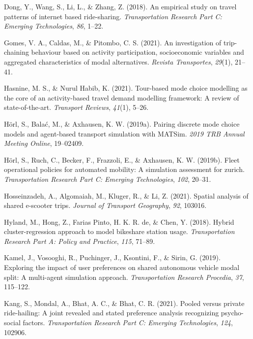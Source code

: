\documentclass[simple, masters, twoside]{byuthesis}
\newlength{\cslhangindent}
\newlength{\cslentryspacingunit} %
\newenvironment{CSLReferences}[2] %
 {%
  \setlength{\parindent}{0pt}
  \ifodd #1
  \let\oldpar\par
  \def\par{\hangindent=\cslhangindent\oldpar}
  \fi
  \setlength{\parskip}{#2\cslentryspacingunit}
 }%
 {}
\begin{document}
\begin{CSLReferences}{1}{0}
\leavevmode{}%
Dong, Y., Wang, S., Li, L., \& Zhang, Z. (2018). An empirical study on travel patterns of internet based ride-sharing. \emph{Transportation Research Part C: Emerging Technologies}, \emph{86}, 1--22.

\leavevmode{}%
Gomes, V. A., Caldas, M., \& Pitombo, C. S. (2021). An investigation of trip-chaining behaviour based on activity participation, socioeconomic variables and aggregated characteristics of modal alternatives. \emph{Revista Transportes}, \emph{29}(1), 21--41.

\leavevmode{}%
Hasnine, M. S., \& Nurul Habib, K. (2021). Tour-based mode choice modelling as the core of an activity-based travel demand modelling framework: A review of state-of-the-art. \emph{Transport Reviews}, \emph{41}(1), 5--26.

\leavevmode{}%
Hörl, S., Balać, M., \& Axhausen, K. W. (2019a). Pairing discrete mode choice models and agent-based transport simulation with MATSim. \emph{2019 TRB Annual Meeting Online}, 19--02409.

\leavevmode{}%
Hörl, S., Ruch, C., Becker, F., Frazzoli, E., \& Axhausen, K. W. (2019b). Fleet operational policies for automated mobility: A simulation assessment for zurich. \emph{Transportation Research Part C: Emerging Technologies}, \emph{102}, 20--31.

\leavevmode{}%
Hosseinzadeh, A., Algomaiah, M., Kluger, R., \& Li, Z. (2021). Spatial analysis of shared e-scooter trips. \emph{Journal of Transport Geography}, \emph{92}, 103016.

\leavevmode{}%
Hyland, M., Hong, Z., Farias Pinto, H. K. R. de, \& Chen, Y. (2018). Hybrid cluster-regression approach to model bikeshare station usage. \emph{Transportation Research Part A: Policy and Practice}, \emph{115}, 71--89.

\leavevmode{}%
Kamel, J., Vosooghi, R., Puchinger, J., Ksontini, F., \& Sirin, G. (2019). Exploring the impact of user preferences on shared autonomous vehicle modal split: A multi-agent simulation approach. \emph{Transportation Research Procedia}, \emph{37}, 115--122.

\leavevmode{}%
Kang, S., Mondal, A., Bhat, A. C., \& Bhat, C. R. (2021). Pooled versus private ride-hailing: A joint revealed and stated preference analysis recognizing psycho-social factors. \emph{Transportation Research Part C: Emerging Technologies}, \emph{124}, 102906.


\end{CSLReferences}
\end{document}
